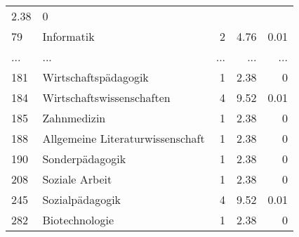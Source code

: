 \begin{longtable}{lXrrr}
          \num[round-mode=places,round-precision=2]{2,38} &
          \num[round-mode=places,round-precision=2]{0} \\
        79 & \multicolumn{1}{X}{Informatik} & %
          \num{2} &
          \num[round-mode=places,round-precision=2]{4,76} &
          \num[round-mode=places,round-precision=2]{0,01} \\
       ... & ... & ... & ... & ... \\
        181 & \multicolumn{1}{X}{Wirtschaftspädagogik} & %
          \num{1} &
          \num[round-mode=places,round-precision=2]{2,38} &
          \num[round-mode=places,round-precision=2]{0} \\

        184 & \multicolumn{1}{X}{Wirtschaftswissenschaften} & %
          \num{4} &
          \num[round-mode=places,round-precision=2]{9,52} &
          \num[round-mode=places,round-precision=2]{0,01} \\

        185 & \multicolumn{1}{X}{Zahnmedizin} & %
          \num{1} &
          \num[round-mode=places,round-precision=2]{2,38} &
          \num[round-mode=places,round-precision=2]{0} \\

        188 & \multicolumn{1}{X}{Allgemeine Literaturwissenschaft} & %
          \num{1} &
          \num[round-mode=places,round-precision=2]{2,38} &
          \num[round-mode=places,round-precision=2]{0} \\

        190 & \multicolumn{1}{X}{Sonderpädagogik} & %
          \num{1} &
          \num[round-mode=places,round-precision=2]{2,38} &
          \num[round-mode=places,round-precision=2]{0} \\

        208 & \multicolumn{1}{X}{Soziale Arbeit} & %
          \num{1} &
          \num[round-mode=places,round-precision=2]{2,38} &
          \num[round-mode=places,round-precision=2]{0} \\

        245 & \multicolumn{1}{X}{Sozialpädagogik} & %
          \num{4} &
          \num[round-mode=places,round-precision=2]{9,52} &
          \num[round-mode=places,round-precision=2]{0,01} \\

        282 & \multicolumn{1}{X}{Biotechnologie} & %
          \num{1} &
          \num[round-mode=places,round-precision=2]{2,38} &
          \num[round-mode=places,round-precision=2]{0} \\


\end{longtable}
